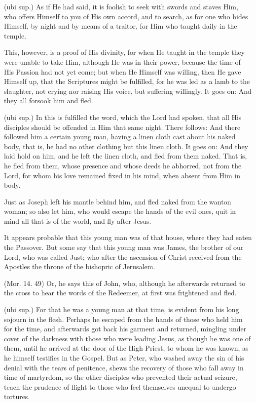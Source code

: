  (ubi sup.) As if He had said, it is foolish to seek with swords and staves Him, who offers Himself to you of His own accord, and to search, as for one who hides Himself, by night and by means of a traitor, for Him who taught daily in the temple.

 This, however, is a proof of His divinity, for when He taught in the temple they were unable to take Him, although He was in their power, because the time of His Passion had not yet come; but when He Himself was willing, then He gave Himself up, that the Scriptures might be fulfilled, for he was led as a lamb to the slaughter, not crying nor raising His voice, but suffering willingly. It goes on: And they all forsook him and fled.

 (ubi sup.) In this is fulfilled the word, which the Lord had spoken, that all His disciples should be offended in Him that same night. There follows: And there followed him a certain young man, having a linen cloth cast about his naked body, that is, he had no other clothing but this linen cloth. It goes on: And they laid hold on him, and he left the linen cloth, and fled from them naked. That is, he fled from them, whose presence and whose deeds he abhorred, not from the Lord, for whom his love remained fixed in his mind, when absent from Him in body.

 Just as Joseph left his mantle behind him, and fled naked from the wanton woman; so also let him, who would escape the hands of the evil ones, quit in mind all that is of the world, and fly after Jesus.

 It appears probable that this young man was of that house, where they had eaten the Passover. But some say that this young man was James, the brother of our Lord, who was called Just; who after the ascension of Christ received from the Apostles the throne of the bishopric of Jerusalem.

 (Mor. 14. 49) Or, he says this of John, who, although he afterwards returned to the cross to hear the words of the Redeemer, at first was frightened and fled.

 (ubi sup.) For that he was a young man at that time, is evident from his long sojourn in the flesh. Perhaps he escaped from the hands of those who held him for the time, and afterwards got back his garment and returned, mingling under cover of the darkness with those who were leading Jesus, as though he was one of them, until he arrived at the door of the High Priest, to whom he was known, as he himself testifies in the Gospel. But as Peter, who washed away the sin of his denial with the tears of penitence, shews the recovery of those who fall away in time of martyrdom, so the other disciples who prevented their actual seizure, teach the prudence of flight to those who feel themselves unequal to undergo tortures.

